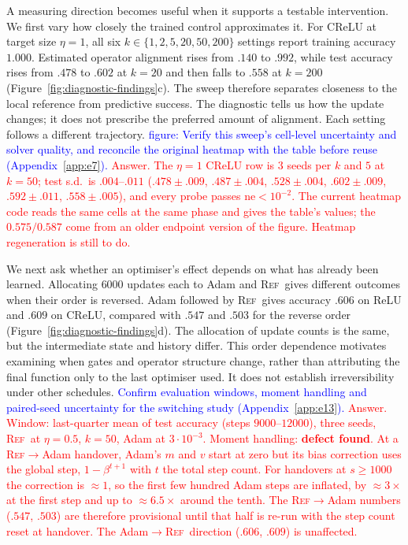 \documentclass{article}
\newcommand{\zied}[1]{\textcolor{blue}{#1}}
\newcommand{\nat}[1]{\textcolor{red}{#1}}
\newcommand{\TOU}{\textsc{Ref}}
\theoremstyle{definition}
\theoremstyle{remark}
\begin{document}
A measuring direction becomes useful when it supports a testable intervention. We first vary how closely the trained control approximates it. For CReLU at target size $\eta=1$, all six $k\in\{1,2,5,20,50,200\}$ settings report training accuracy $1.000$. Estimated operator alignment rises from $.140$ to $.992$, while test accuracy rises from $.478$ to $.602$ at $k=20$ and then falls to $.558$ at $k=200$ (Figure~\ref{fig:diagnostic-findings}c). The sweep therefore separates closeness to the local reference from predictive success. The diagnostic tells us how the update changes; it does not prescribe the preferred amount of alignment. Each setting follows a different trajectory. \zied{figure: Verify this sweep's cell-level uncertainty and solver quality, and reconcile the original heatmap with the table before reuse (Appendix~\ref{app:e7}).}
\nat{Answer. The $\eta=1$ CReLU row is $3$ seeds per $k$ and $5$ at $k=50$; test s.d.\ is $.004$--$.011$ ($.478\pm.009$, $.487\pm.004$, $.528\pm.004$, $.602\pm.009$, $.592\pm.011$, $.558\pm.005$), and every probe passes $\mathrm{ne}<10^{-2}$. The current heatmap code reads the same cells at the same phase and gives the table's values; the $0.575/0.587$ come from an older endpoint version of the figure. Heatmap regeneration is still to do.}

We next ask whether an optimiser's effect depends on what has already been learned. Allocating $6000$ updates each to Adam and \TOU\ gives different outcomes when their order is reversed. Adam followed by \TOU\ gives accuracy $.606$ on ReLU and $.609$ on CReLU, compared with $.547$ and $.503$ for the reverse order (Figure~\ref{fig:diagnostic-findings}d). The allocation of update counts is the same, but the intermediate state and history differ. This order dependence motivates examining when gates and operator structure change, rather than attributing the final function only to the last optimiser used. It does not establish irreversibility under other schedules. \zied{Confirm evaluation windows, moment handling and paired-seed uncertainty for the switching study (Appendix~\ref{app:e13}).}
\nat{Answer. Window: last-quarter mean of test accuracy (steps $9000$--$12000$), three seeds, \TOU\ at $\eta=0.5$, $k=50$, Adam at $3\cdot10^{-3}$. Moment handling: \textbf{defect found}. At a \TOU$\to$Adam handover, Adam's $m$ and $v$ start at zero but its bias correction uses the global step, $1-\beta^{t+1}$ with $t$ the total step count. For handovers at $s\ge1000$ the correction is $\approx1$, so the first few hundred Adam steps are inflated, by $\approx3\times$ at the first step and up to $\approx6.5\times$ around the tenth. The \TOU$\to$Adam numbers ($.547$, $.503$) are therefore provisional until that half is re-run with the step count reset at handover. The Adam$\to$\TOU\ direction ($.606$, $.609$) is unaffected.}
\end{document}
